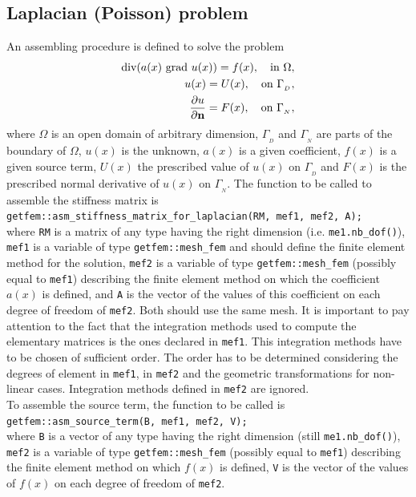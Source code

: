 \documentclass[11pt,a4paper]{article}
\begin{document}
\subsection{Laplacian (Poisson) problem}

An assembling procedure is defined to solve the problem
\begin{eqnarray*}
  \mbox{div}(a(x)\ \mbox{grad }u(x)) = f(x), \ \ \mbox{ in } \Omega, \\
  u(x) = U(x),  \ \ \mbox{ on } \Gamma_{_D}, \\
  {\displaystyle \frac{\displaystyle \partial u}{\displaystyle \partial \bf n}} = F(x),  \ \ \mbox{ on } \Gamma_{_N},   
\end{eqnarray*}
where $\Omega$ is an open domain of arbitrary dimension, $\Gamma_{_D}$ and $\Gamma_{_N}$ are parts of the boundary of $\Omega$, $u(x)$ is the unknown, $a(x)$ is a given coefficient, $f(x)$ is a given source term, $U(x)$ the prescribed value of $u(x)$ on $\Gamma_{_D}$ and $F(x)$ is the prescribed normal derivative of $u(x)$ on $\Gamma_{_N}$.
The function to be called to assemble the stiffness matrix is\\[0.5cm]
{\tt getfem::asm\_stiffness\_matrix\_for\_laplacian(RM, mef1, mef2, A);} \\[0.5cm]
where {\tt RM} is a matrix of any type having the right dimension (i.e. {\tt me1.nb\_dof()}), {\tt mef1} is a variable of type {\tt getfem::mesh\_fem} and should define the finite element method for the solution, {\tt mef2}  is a variable of type {\tt getfem::mesh\_fem} (possibly equal to {\tt mef1}) describing the finite element method on which the coefficient $a(x)$ is defined, and {\tt A} is the vector of the values of this coefficient on each degree of freedom of {\tt mef2}. Both should use the same mesh. It is important to pay attention to the fact that the integration methods used to compute the elementary matrices is the ones declared in {\tt mef1}. This integration methods have to be chosen of sufficient order. The order has to be determined considering the degrees of element in {\tt mef1}, in {\tt mef2} and the geometric transformations for non-linear cases. Integration methods defined in {\tt mef2} are ignored.\\[0.5cm]
To assemble the source term, the  function to be called is\\[0.5cm]
{\tt getfem::asm\_source\_term(B, mef1, mef2, V);} \\[0.5cm]
where {\tt B} is a vector of any type having the right dimension (still {\tt me1.nb\_dof()}), {\tt mef2}  is a variable of type {\tt getfem::mesh\_fem} (possibly equal to {\tt mef1}) describing the finite element method on which $f(x)$ is defined, {\tt V} is the vector of the values of $f(x)$ on each degree of freedom of {\tt mef2}.\\[0.5cm]
\end{document}
